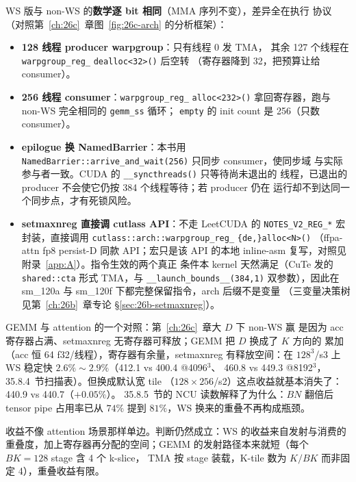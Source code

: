 WS 版与 non-WS 的\textbf{数学逐 bit 相同}（MMA 序列不变），差异全在执行
协议（对照第~\ref{ch:26c}~章图~\ref{fig:26c-arch} 的分析框架）：

\begin{itemize}[itemsep=1pt,topsep=2pt]
  \item \textbf{128 线程 producer warpgroup}：只有线程 0 发 TMA，
        其余 127 个线程在 \texttt{warpgroup\_reg\_}\allowbreak
        \texttt{dealloc<32>()} 后空转
        （寄存器降到 32，把预算让给 consumer）。
  \item \textbf{256 线程 consumer}：\texttt{warpgroup\_reg\_}\allowbreak
        \texttt{alloc<232>()} 拿回寄存器，跑与 non-WS 完全相同的
        \texttt{gemm\_ss} 循环；
        \texttt{empty} 的 init count 是 256（只数 consumer）。

  \item \textbf{epilogue 换 NamedBarrier}：本书用
        \texttt{NamedBarrier::arrive\_and\_wait(256)} 只同步 consumer，使同步域
        与实际参与者一致。CUDA 的 \texttt{\_\_syncthreads()} 只等待尚未退出的
        线程，已退出的 producer 不会使它仍按 384 个线程等待；若 producer 仍在
        运行却不到达同一个同步点，才有死锁风险。
  \item \textbf{setmaxnreg 直接调 cutlass API}：不走 LeetCUDA 的
        \texttt{NOTES\_V2\_REG\_*} 宏封装，直接调用
        \texttt{cutlass::arch::}\allowbreak\texttt{warpgroup\_reg\_}\allowbreak
        \texttt{\{de,\}alloc<N>()}
        （ffpa-attn fp8 persist-D 同款 API；宏只是该 API 的本地
        inline-asm 复写，对照见附录~\ref{app:A}）。指令生效的两个真正
        条件本 kernel 天然满足（CuTe 发的 \texttt{shared::cta} 形式
        TMA，与 \texttt{\_\_launch\_bounds\_\_(384,1)} 双参数），因此在
        sm\_120a 与 sm\_120f 下都完整保留指令，arch 后缀不是变量
        （三变量决策树见第~\ref{ch:26b}~章专论
        \S\ref{sec:26b-setmaxnreg}）。
\end{itemize}

GEMM 与 attention 的一个对照：第~\ref{ch:26c}~章大 $D$ 下 non-WS 赢
是因为 acc 寄存器占满、setmaxnreg 无寄存器可释放；GEMM 把 $D$ 换成了 $K$ 方向的
累加（acc 恒 64 f32/线程），寄存器有余量，setmaxnreg 有释放空间：在
$128^3$/s3 上 WS 稳定快 $2.6\%\sim2.9\%$（412.1 vs 400.4 @4096$^3$、
460.8 vs 449.3 @8192$^3$，35.8.4~节扫描表）。但换成默认宽 tile
（$128\times256$/s2）这点收益就基本消失了：440.9 vs 440.7（$+0.05\%$）。
35.8.5~节的 NCU 读数解释了为什么：$BN$ 翻倍后 tensor pipe 占用率已从
$74\%$ 提到 $81\%$，WS 换来的重叠不再构成瓶颈。

收益不像 attention 场景那样单边。判断仍然成立：WS 的收益来自发射与消费的
重叠度，加上寄存器再分配的空间；GEMM 的发射路径本来就短（每个 $BK{=}128$ stage 含 4 个 k-slice，
TMA 按 stage 装载，K-tile 数为 $K/BK$ 而非固定 4），重叠收益有限。

